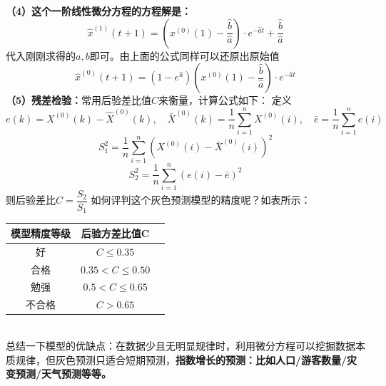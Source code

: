 \documentclass[11pt,a4paper]{article}
\begin{document}
\textbf{（4）这个一阶线性微分方程的方程解是：}
\begin{equation*}
	\hat x^{(1)}(t+1)=(x^{(0)}(1)-\dfrac{\hat b}{\hat a})\cdot e^{-\hat a t}+\dfrac{\hat b}{\hat a}
\end{equation*}
代入刚刚求得的$a,b$即可。由上面的公式同样可以还原出原始值
\begin{equation*}
	\hat x^{(0)}(t+1)=(1-e^{\hat a})(x^{(0)}(1)-\dfrac{\hat b}{\hat a})\cdot e^{-\hat a t}
\end{equation*}
\textbf{（5）残差检验：}常用后验差比值$C$来衡量，计算公式如下：
定义
\begin{equation*}
e(k)=X^{(0)}(k)-\hat X^{(0)}(k),\quad \bar X^{(0)}(k)=\dfrac{1}{n}\sum_{i=1}^{n}X^{(0)}(i),\quad \bar e=\dfrac{1}{n}\sum_{i=1}^{n}e(i)
\end{equation*}
\begin{equation*}
	S_1^2=\dfrac{1}{n}\sum_{i=1}^{n}(X^{(0)}(i)-\bar X^{(0)}(i))^2
\end{equation*}
\begin{equation*}
	S_2^2=\dfrac{1}{n}\sum_{i=1}^{n}(e(i)-\bar e)^2
\end{equation*}
则后验差比$C=\dfrac{S_2}{S_1}$
如何评判这个灰色预测模型的精度呢？如表所示：
\begin{table}[h]
	\centering
	\begin{tabular}{ccc}
		\hline
		模型精度等级& 后验方差比值C \\
		\hline
		好 & $C \le 0.35$\\
		合格 & $0.35<C\le 0.50$\\
		勉强 & $0.5<C \le 0.65$\\
		不合格 & $C>0.65$\\
		\hline
	\end{tabular}
\end{table}\\
总结一下模型的优缺点：在数据少且无明显规律时，利用微分方程可以挖掘数据本质规律，但灰色预测只适合短期预测，\textbf{指数增长的预测：比如人口/游客数量/灾变预测/天气预测等等。}
\end{document}
